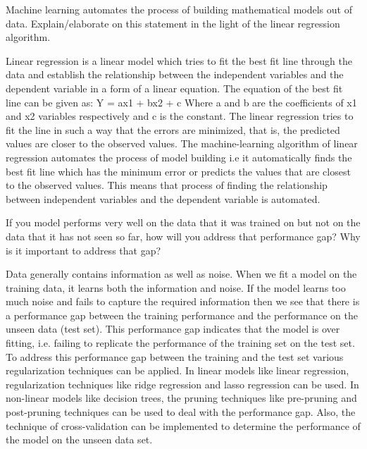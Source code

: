 	\begin{qanda}
		\begin{question}
Machine learning automates the process of building mathematical models out of data. Explain/elaborate on this statement in the light of the linear regression algorithm.
		\end{question}
		\begin{answer}
Linear regression is a linear model which tries to fit the best fit line through the data and establish the relationship between the independent variables and the dependent variable in a form of a linear equation. The equation of the best fit line can be given as: Y = ax1 + bx2 + c Where a and b are the coefficients of x1 and x2 variables respectively and c is the constant. The linear regression tries to fit the line in such a way that the errors are minimized, that is, the predicted values are closer to the observed values. The machine-learning algorithm of linear regression automates the process of model building i.e it automatically finds the best fit line which has the minimum error or predicts the values that are closest to the observed values. This means that process of finding the relationship between independent variables and the dependent variable is automated.
		\end{answer}
	\end{qanda}

	\begin{qanda}
		\begin{question}
 If you model performs very well on the data that it was trained on but not on the data that it has not seen so far, how will you address that performance gap? Why is it important to address that gap?
		\end{question}
		\begin{answer}
Data generally contains information as well as noise. When we fit a model on the training data, it learns both the information and noise. If the model learns too much noise and fails to capture the required information then we see that there is a performance gap between the training performance and the performance on the unseen data (test set). This performance gap indicates that the model is over fitting, i.e. failing to replicate the performance of the training set on the test set. To address this performance gap between the training and the test set various regularization techniques can be applied. In linear models like linear regression, regularization techniques like ridge regression and lasso regression can be used. In non-linear models like decision trees, the pruning techniques like pre-pruning and post-pruning techniques can be used to deal with the performance gap. Also, the technique of cross-validation can be implemented to determine the performance of the model on the unseen data set.
		\end{answer}
	\end{qanda}

